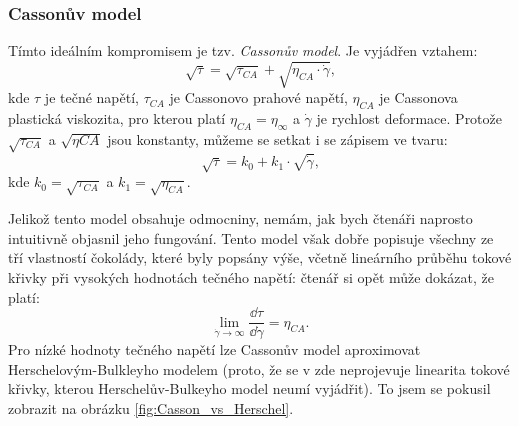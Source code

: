 \documentclass[12pt]{article}
\begin{document}
\subsubsection{Cassonův model}
\label{sec:Casson}
Tímto ideálním kompromisem je tzv. \emph{Cassonův model}. Je vyjádřen vztahem:~\cite{Article:Comparison_of_models_chocolate}\cite{Article:Determination_of_chocolate_viscosity}\cite{Article:Extended_casson_equation}\cite{Article:Flow_properties_molten_chocolate}
\begin{equation}
    \sqrt{\tau} = \sqrt{\tau_{CA}} + \sqrt{\eta_{CA}\cdot\dot\gamma}\text{,}
    \label{eq:Casson_model}
\end{equation}
kde $\tau$ je tečné napětí, $\tau_{CA}$ je Cassonovo prahové napětí, $\eta_{CA}$ je Cassonova plastická viskozita, pro kterou platí $\eta_{CA} = \eta_\infty$ a $\dot\gamma$ je rychlost deformace. Protože $\sqrt{\tau_{CA}}$ a $\sqrt{\eta{CA}}$ jsou konstanty, můžeme se setkat i se zápisem ve tvaru:~\cite{Article:Rapid_and_economic_chocolate_viscosity}
\begin{equation}
    \sqrt{\tau} = k_0 + k_1\cdot\sqrt{\dot\gamma}\text{,}
\end{equation}
kde $k_0 = \sqrt{\tau_{CA}}$ a $k_1 = \sqrt{\eta_{CA}}$.
\par\noindent
Jelikož tento model obsahuje odmocniny, nemám, jak bych čtenáři naprosto intuitivně objasnil jeho fungování. Tento model však dobře popisuje všechny ze tří vlastností čokolády, které byly popsány výše, včetně lineárního průběhu tokové křivky při vysokých hodnotách tečného napětí: čtenář si opět může dokázat, že platí:
\begin{equation}
    \lim_{\dot\gamma\to\infty} \frac{\dd\tau}{\dd\dot\gamma} = \eta_{CA}\text{.}
\end{equation}
Pro nízké hodnoty tečného napětí lze Cassonův model aproximovat Herschelovým-Bulkleyho modelem (proto, že se v zde neprojevuje linearita tokové křivky, kterou Herschelův-Bulkeyho model neumí vyjádřit). To jsem se pokusil zobrazit na obrázku \ref{fig:Casson_vs_Herschel}.
\end{document}
